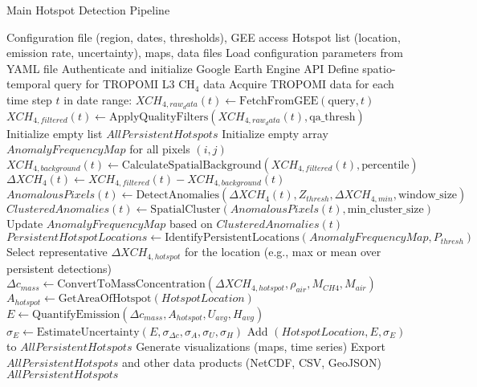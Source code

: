 \documentclass[12pt,a4paper]{article}
\begin{document}
\begin{algorithm}[H]
\caption{Main Hotspot Detection Pipeline}
\label{alg:main_pipeline}
\begin{algorithmic}[1]
\REQUIRE Configuration file (region, dates, thresholds), GEE access
\ENSURE Hotspot list (location, emission rate, uncertainty), maps, data files
\STATE Load configuration parameters from YAML file
\STATE Authenticate and initialize Google Earth Engine API
\STATE Define spatio-temporal query for TROPOMI L3 CH$_4$ data
\STATE Acquire TROPOMI data for each time step $t$ in date range:
    \STATE $XCH_{4,raw_data}(t) \leftarrow \text{FetchFromGEE}(\text{query}, t)$
    \STATE $XCH_{4,filtered}(t) \leftarrow \text{ApplyQualityFilters}(XCH_{4,raw_data}(t), \text{qa\_thresh})$
\STATE Initialize empty list $AllPersistentHotspots$
\STATE Initialize empty array $AnomalyFrequencyMap$ for all pixels $(i,j)$
    \STATE $XCH_{4,background}(t) \leftarrow \text{CalculateSpatialBackground}(XCH_{4,filtered}(t), \text{percentile})$
    \STATE $\Delta XCH_4(t) \leftarrow XCH_{4,filtered}(t) - XCH_{4,background}(t)$
    \STATE $AnomalousPixels(t) \leftarrow \text{DetectAnomalies}(\Delta XCH_4(t), Z_{thresh}, \Delta XCH_{4,min}, \text{window\_size})$ 
    \STATE $ClusteredAnomalies(t) \leftarrow \text{SpatialCluster}(AnomalousPixels(t), \text{min\_cluster\_size})$
    \STATE Update $AnomalyFrequencyMap$ based on $ClusteredAnomalies(t)$
\ENDFOR
\STATE $PersistentHotspotLocations \leftarrow \text{IdentifyPersistentLocations}(AnomalyFrequencyMap, P_{thresh})$
    \STATE Select representative $\Delta XCH_{4,hotspot}$ for the location (e.g., max or mean over persistent detections)
    \STATE $\Delta c_{mass} \leftarrow \text{ConvertToMassConcentration}(\Delta XCH_{4,hotspot}, \rho_{air}, M_{CH4}, M_{air})$
    \STATE $A_{hotspot} \leftarrow \text{GetAreaOfHotspot}(HotspotLocation)$
    \STATE $E \leftarrow \text{QuantifyEmission}(\Delta c_{mass}, A_{hotspot}, U_{avg}, H_{avg})$ 
    \STATE $\sigma_E \leftarrow \text{EstimateUncertainty}(E, \sigma_{\Delta c}, \sigma_A, \sigma_U, \sigma_H)$
    \STATE Add $(HotspotLocation, E, \sigma_E)$ to $AllPersistentHotspots$
\ENDFOR
\STATE Generate visualizations (maps, time series)
\STATE Export $AllPersistentHotspots$ and other data products (NetCDF, CSV, GeoJSON)
\RETURN $AllPersistentHotspots$
\end{algorithmic}
\end{algorithm}
\end{document}
